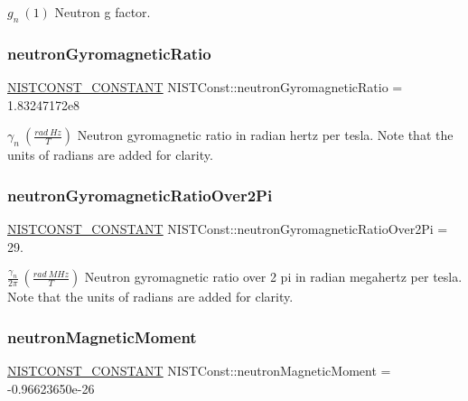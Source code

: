 $g_n \ (1)$ Neutron g factor. \mbox{\label{group___n_i_s_t_const-_neutron_gae41519ad6817ec697afb92b914ad0b14}} 
\subsubsection{\texorpdfstring{neutron\+Gyromagnetic\+Ratio}{neutronGyromagneticRatio}}
{\footnotesize\ttfamily \mbox{\hyperlink{_n_i_s_t_const_8hpp_a2b0fc1d7452373f816175dd86ce26729}{N\+I\+S\+T\+C\+O\+N\+S\+T\+\_\+\+C\+O\+N\+S\+T\+A\+NT}} N\+I\+S\+T\+Const\+::neutron\+Gyromagnetic\+Ratio = 1.\+83247172e8}

$\gamma_n \ (\frac{rad\ Hz}{T})$ Neutron gyromagnetic ratio in radian hertz per tesla. Note that the units of radians are added for clarity. \mbox{\label{group___n_i_s_t_const-_neutron_gaadb23cc5d8146b6a47bcfe0798e51674}} 
\subsubsection{\texorpdfstring{neutron\+Gyromagnetic\+Ratio\+Over2\+Pi}{neutronGyromagneticRatioOver2Pi}}
{\footnotesize\ttfamily \mbox{\hyperlink{_n_i_s_t_const_8hpp_a2b0fc1d7452373f816175dd86ce26729}{N\+I\+S\+T\+C\+O\+N\+S\+T\+\_\+\+C\+O\+N\+S\+T\+A\+NT}} N\+I\+S\+T\+Const\+::neutron\+Gyromagnetic\+Ratio\+Over2\+Pi = 29.}

$\frac{\gamma_n}{2\pi} \ (\frac{rad\ MHz}{T})$ Neutron gyromagnetic ratio over 2 pi in radian megahertz per tesla. Note that the units of radians are added for clarity. \mbox{\label{group___n_i_s_t_const-_neutron_gab5d1be65ba0e6d7851bad31495663148}} 
\subsubsection{\texorpdfstring{neutron\+Magnetic\+Moment}{neutronMagneticMoment}}
{\footnotesize\ttfamily \mbox{\hyperlink{_n_i_s_t_const_8hpp_a2b0fc1d7452373f816175dd86ce26729}{N\+I\+S\+T\+C\+O\+N\+S\+T\+\_\+\+C\+O\+N\+S\+T\+A\+NT}} N\+I\+S\+T\+Const\+::neutron\+Magnetic\+Moment = -\/0.\+96623650e-\/26}


